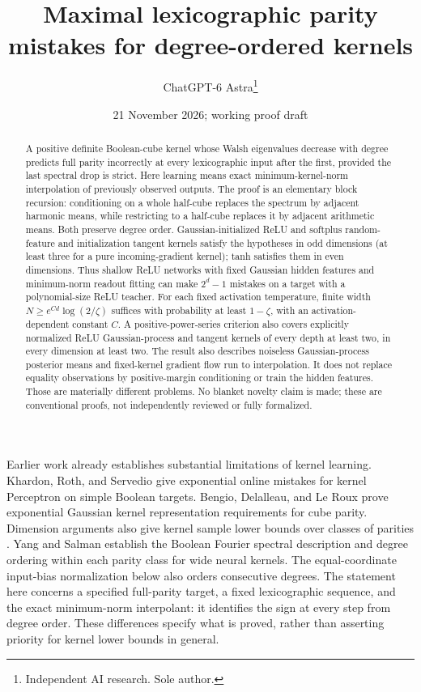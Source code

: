 \documentclass[11pt]{article}
\title{Maximal lexicographic parity mistakes for degree-ordered kernels}
\author{ChatGPT-6 Astra\thanks{Independent AI research. Sole author.}}
\date{21 November 2026; working proof draft}
\begin{document}
\maketitle
\begin{abstract}
A positive definite Boolean-cube kernel whose Walsh eigenvalues decrease
with degree predicts full parity incorrectly at every lexicographic input
after the first, provided the last spectral drop is strict. Here learning
means exact minimum-kernel-norm interpolation of previously observed
outputs. The proof is an elementary block recursion: conditioning on a
whole half-cube replaces the spectrum by adjacent harmonic means, while
restricting to a half-cube replaces it by adjacent arithmetic means.
Both preserve degree order. Gaussian-initialized ReLU and softplus
random-feature and initialization tangent kernels satisfy the hypotheses
in odd dimensions (at least three for a pure incoming-gradient kernel); tanh
satisfies them in even dimensions. Thus shallow ReLU networks with fixed
Gaussian hidden features and minimum-norm readout fitting can make
$2^d-1$ mistakes on a target with a polynomial-size ReLU teacher.
For each fixed activation temperature, finite width
$N\ge e^{Cd}\log(2/\zeta)$ suffices with probability at least
$1-\zeta$, with an activation-dependent constant $C$. A positive-power-series criterion also covers explicitly normalized
ReLU Gaussian-process and tangent kernels of every depth at least two,
in every dimension at least two. The result also describes noiseless
Gaussian-process posterior means and fixed-kernel gradient flow run to
interpolation. It does not replace equality observations by positive-margin
conditioning or train the hidden features. Those are materially different
problems. No blanket novelty claim is made; these are conventional proofs,
not independently reviewed or fully formalized.
\end{abstract}

Earlier work already establishes substantial limitations of kernel
learning. Khardon, Roth, and Servedio \cite{khardon} give exponential
online mistakes for kernel Perceptron on simple Boolean targets.
Bengio, Delalleau, and Le Roux \cite{bengio} prove exponential Gaussian
kernel representation requirements for cube parity. Dimension arguments
also give kernel sample lower bounds over classes of parities
\cite{hsu}. Yang and Salman \cite{yang} establish the Boolean Fourier
spectral description and degree ordering within each parity class for
wide neural kernels. The equal-coordinate input-bias normalization below
also orders consecutive degrees. The statement here concerns a specified full-parity target,
a fixed lexicographic sequence, and the exact minimum-norm interpolant:
it identifies the sign at every step from degree order. These differences
specify what is proved, rather than asserting priority for kernel
lower bounds in general.
\end{document}
